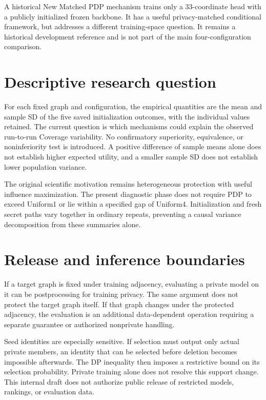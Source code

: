 A historical New Matched PDP mechanism trains only a 33-coordinate head with a publicly initialized frozen backbone. It has a useful privacy-matched conditional framework, but addresses a different training-space question. It remains a historical development reference and is not part of the main four-configuration comparison.

\section{Descriptive research question}
For each fixed graph and configuration, the empirical quantities are the mean and sample SD of the five saved initialization outcomes, with the individual values retained. The current question is which mechanisms could explain the observed run-to-run Coverage variability. No confirmatory superiority, equivalence, or noninferiority test is introduced. A positive difference of sample means alone does not establish higher expected utility, and a smaller sample SD does not establish lower population variance.

The original scientific motivation remains heterogeneous protection with useful influence maximization. The present diagnostic phase does not require PDP to exceed Uniform1 or lie within a specified gap of Uniform4. Initialization and fresh secret paths vary together in ordinary repeats, preventing a causal variance decomposition from these summaries alone.

\section{Release and inference boundaries}
If a target graph is fixed under training adjacency, evaluating a private model on it can be postprocessing for training privacy. The same argument does not protect the target graph itself. If that graph changes under the protected adjacency, the evaluation is an additional data-dependent operation requiring a separate guarantee or authorized nonprivate handling.

Seed identities are especially sensitive. If selection must output only actual private members, an identity that can be selected before deletion becomes impossible afterwards. The DP inequality then imposes a restrictive bound on its selection probability. Private training alone does not resolve this support change. This internal draft does not authorize public release of restricted models, rankings, or evaluation data.

